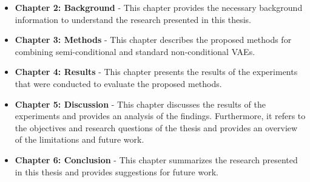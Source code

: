 \begin{itemize}
    \item \textbf{Chapter 2: Background} - This chapter provides the necessary background information to understand the research presented in this thesis. 
    \item \textbf{Chapter 3: Methods} - This chapter describes the proposed methods for combining semi-conditional and standard non-conditional VAEs.
    \item \textbf{Chapter 4: Results} - This chapter presents the results of the experiments that were conducted to evaluate the proposed methods.
    \item \textbf{Chapter 5: Discussion} - This chapter discusses the results of the experiments and provides an analysis of the findings. Furthermore, it refers to the objectives and research questions of the thesis and provides an overview of the limitations and future work.
    \item \textbf{Chapter 6: Conclusion} - This chapter summarizes the research presented in this thesis and provides suggestions for future work.
    
\end{itemize}

